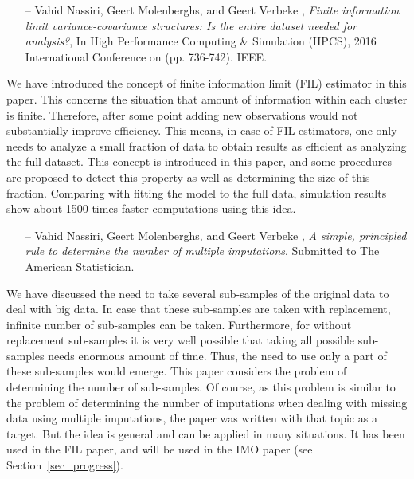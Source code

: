 \documentclass[14pt]{article}
\begin{document}
\begin{itemize}
\item[--]{\textsf{Vahid Nassiri, Geert Molenberghs, and Geert Verbeke}} , {\it Finite information limit variance-covariance structures: Is the entire dataset needed for analysis?}, In High Performance Computing \& Simulation (HPCS), 2016 International Conference on (pp. 736-742). IEEE.
\end{itemize}
We have introduced the concept of finite information limit (FIL) estimator in this paper. This concerns the situation that amount of information within each cluster is finite. Therefore, after some point adding new observations would not substantially improve efficiency. This means, in case of FIL estimators, one only needs to analyze a small fraction of data to obtain results as efficient as analyzing the full dataset. This concept is introduced in this paper, and some procedures are proposed to detect this property as well as determining the size of this fraction. Comparing with fitting the model to the full data, simulation results show about 1500 times faster computations using this idea.


\begin{itemize}
\item[--]{\textsf{Vahid Nassiri, Geert Molenberghs, and Geert Verbeke}} , {\it A simple, principled rule to determine the number of multiple imputations}, Submitted to The American Statistician.
\end{itemize}
We have discussed the need to take several sub-samples of the original data to deal with big data. In case that these sub-samples are taken with replacement, infinite number of sub-samples can be taken. Furthermore, for without replacement sub-samples it is very well possible that taking all possible sub-samples needs enormous amount of time. Thus, the need to use only a part of these sub-samples would emerge. This paper considers the problem of determining the number of sub-samples. Of course, as this problem is similar to the problem of determining the number of imputations when dealing with missing data using multiple imputations, the paper was written with that topic as a target. But the idea is general and can be applied in many situations. It has been used in the FIL paper, and will be used in the IMO paper (see Section~\ref{sec_progress}).
\end{document}
